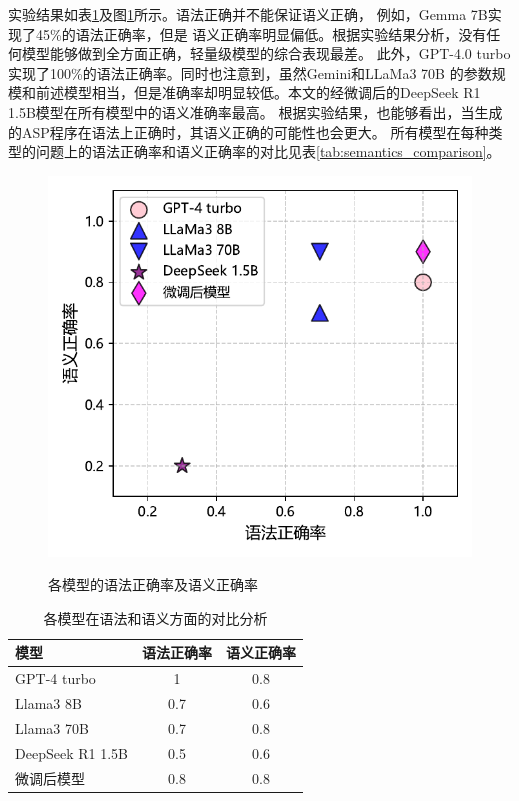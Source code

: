 实验结果如表\ref{fig:overall_syntactics_semantics}及图\ref{fig:syntactics_and_semantics}所示。语法正确并不能保证语义正确，
例如，Gemma 7B实现了45\%的语法正确率，但是
语义正确率明显偏低。根据实验结果分析，没有任何模型能够做到全方面正确，轻量级模型的综合表现最差。
此外，GPT-4.0 turbo实现了100\%的语法正确率。同时也注意到，虽然Gemini和LLaMa3 70B
的参数规模和前述模型相当，但是准确率却明显较低。本文的经微调后的DeepSeek R1 1.5B模型在所有模型中的语义准确率最高。
根据实验结果，也能够看出，当生成的ASP程序在语法上正确时，其语义正确的可能性也会更大。
所有模型在每种类型的问题上的语法正确率和语义正确率的对比见表\ref{tab:semantics_comparison}。
\begin{figure}
    \centering
    \includegraphics{figures/syntactics_and_semantics.pdf}
    \label{fig:syntactics_and_semantics}
    \caption{各模型的语法正确率及语义正确率}
\end{figure}
\begin{table}
    \centering
    \begin{tabular}{lcc}
        \toprule
        \textbf{模型} & \textbf{语法正确率} & \textbf{语义正确率} \\
        \midrule
        GPT-4 turbo & 1 & 0.8 \\
        Llama3 8B & 0.7 & 0.6 \\
        Llama3 70B & 0.7 & 0.8 \\
        DeepSeek R1 1.5B & 0.5 & 0.6 \\
        \midrule
        微调后模型 & 0.8 & 0.8 \\
        \bottomrule
    \end{tabular}
    \label{fig:overall_syntactics_semantics}
    \caption{各模型在语法和语义方面的对比分析}
\end{table}
